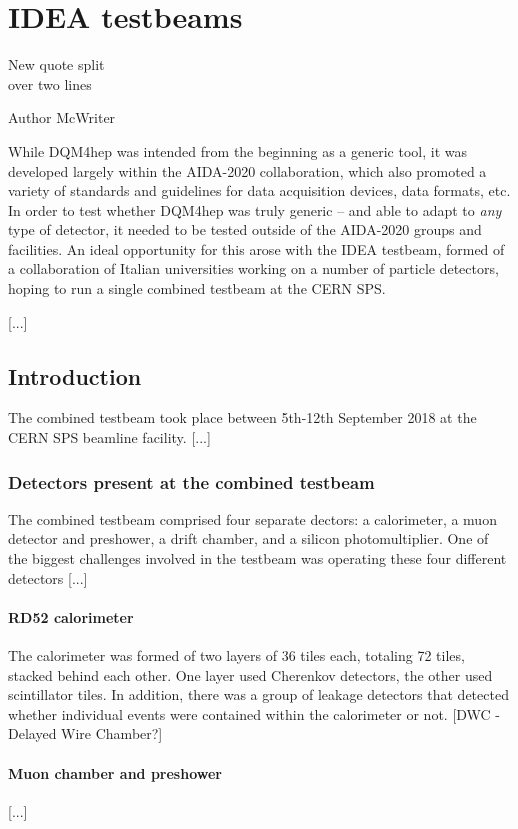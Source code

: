 \chapter{IDEA testbeams}
\label{chapter:ideatestbeam}

\epigraph{New quote split \\ over two lines}{Author McWriter}

While DQM4hep was intended from the beginning as a generic tool, it was developed largely within the AIDA-2020 collaboration, which also promoted a variety of standards and guidelines for data acquisition devices, data formats, etc. In order to test whether DQM4hep was truly generic -- and able to adapt to \textit{any} type of detector, it needed to be tested outside of the AIDA-2020 groups and facilities. An ideal opportunity for this arose with the IDEA testbeam, formed of a collaboration of Italian universities working on a number of particle detectors, hoping to run a single combined testbeam at the CERN \acrshort{SPS}. 

[...]

\section{Introduction}
The combined testbeam took place between 5th-12th September 2018 at the CERN SPS beamline facility. [...]

\subsection*{Detectors present at the combined testbeam}
The combined testbeam comprised four separate dectors: a calorimeter, a muon detector and preshower, a drift chamber, and a silicon photomultiplier. One of the biggest challenges involved in the testbeam was operating these four different detectors [...]

\subsubsection{RD52 calorimeter}
The calorimeter was formed of two layers of 36 tiles each, totaling 72 tiles, stacked behind each other. One layer used Cherenkov detectors, the other used scintillator tiles. In addition, there was a group of leakage detectors that detected whether individual events were contained within the calorimeter or not. [DWC - Delayed Wire Chamber?]

\subsubsection{Muon chamber and preshower}
[...]

